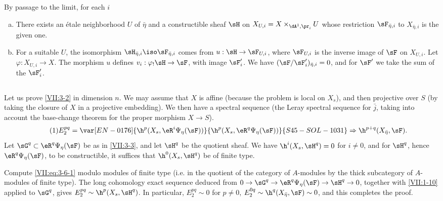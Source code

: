 By passage to the limit, for each $i$
\begin{enumerate}[a)]
  \item There exists an étale neighborhood $U$ of $\bar\eta$ and a
    constructible sheaf $\sH$ on
    $X_{U,i} = X\times_{\dA^1,\pr_i} U$ whose restriction
    $\sF_{\bar\eta,i}$ to $X_{\bar\eta,i}$ is the given one.
  \item For a suitable $U$, the isomorphism
    $\sH_{\bar\eta,i} \iso \sF_{\bar\eta,i}$ comes from
    $u:\sH\to \sF_{U,i}$, where $\sF_{U,i}$ is the inverse image of $\sF$ on
    $X_{U,i}$. Let $\varphi:X_{U,i} \to X$. The morphism $u$ defines
    $v_i:\varphi_! \sH \to \sF$, with image $\sF_i'$. We have
    $(\sF/\sF_i')_{\bar\eta,i} = 0$, and for $\sF'$ we take the sum of the
    $\sF_i'$.
\end{enumerate}






\subsection{}\label{VII:3-6}

Let us prove \ref{VII:3-2} in dimension $n$. We may assume that $X$ is affine
(because the problem is local on $X_s$), and then projective over $S$ (by
taking the closure of $X$ in a projective embedding). We then have a spectral
sequence  (the Leray spectral sequence for $\bar j$, taking
into account the base-change theorem for the proper morphism $X\to S$).
\begin{equation*}\tag{1}\label{VII:eq:3-6-1}
  E_2^{p q} = \var[EN-0176]{\h^p(X_s,\eR^i\Psi_\eta(\sF))}{\h^p(X_s,\eR^q\Psi_\eta(\sF))}{S45-SOL-1031} \Rightarrow \h^{p+q}(X_{\bar\eta},\sF) \text{.} 
\end{equation*}
Let $\sG^q\subset \eR^q \Psi_\eta(\sF)$ be as in \ref{VII:3-3}, and let
$\sH^q$ be the quotient sheaf. We have $\h^i(X_s,\sH^q)=0$ for $i\ne 0$, and
for $\sH^q$, hence $\eR^q\Psi_\eta(\sF)$, to be constructible, it suffices
that $\h^0(X_s,\sH^q)$ be of finite type.

Compute \eqref{VII:eq:3-6-1} modulo modules of finite type (i.e. in the
quotient of the category of $A$-modules by the thick subcategory of
$A$-modules of finite type). The long cohomology exact sequence deduced from
$0 \to \sG^q \to \eR^q\Psi_\eta(\sF) \to \sH^q \to 0$, together with
\ref{VII:1-10} applied to $\sG^q$, gives
$E_2^{p q} \sim \h^p(X_s,\sH^q)$. In particular,
$E_2^{p q}\sim 0$ for $p\ne 0$,
$E_2^{0 q}\sim \h^q(X_{\bar\eta},\sF) \sim 0$, and this completes the proof.

